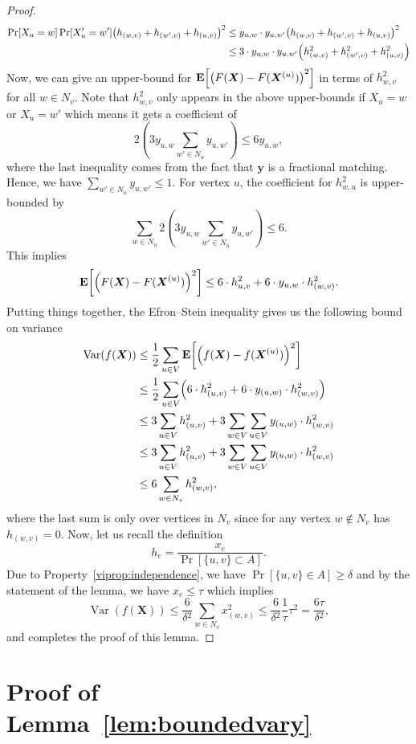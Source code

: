 \documentclass[letterpaper,11pt]{article}
\DeclareMathOperator{\E}{\ensuremath{\normalfont \textbf{E}}}
\newcommand{\unmapr}[0]{\ensuremath{\delta}}
\newcommand{\adj}{\ensuremath{N}\xspace}
\newcommand{\funcZ}[0]{f}
\DeclareMathOperator{\var}{Var}
\let\originalleft\left
\let\originalright\right
\renewcommand{\left}{\mathopen{}\mathclose\bgroup\originalleft}
\renewcommand{\right}{\aftergroup\egroup\originalright}
\begin{document}
\begin{proof}
\begin{align*}
\Pr[X_u=w]\Pr[X'_u=w']\left(h_{(w,v)} + h_{(w',v)} + h_{(u,v)}\right)^2
& \leq  y_{u,w}\cdot y_{u,w'}\left(h_{(w,v)} + h_{(w',v)}+h_{(u,v)}\right)^2\\
& \leq 3\cdot y_{u,w}\cdot y_{u,w'} \left(h_{(w,v)}^2 + h_{(w',v)}^2+h_{(u,v)}^2\right)
\end{align*}
Now, we can give an  upper-bound for $\E\left[\left(F(\bm{X}) - F(\bm{X}^{(u)}) \right)^2\right]$ in  terms of $h_{w,v}^2$ for all $w\in \adj_v$. Note that $h_{w,v}^2$ only appears in the above upper-bounds if $X_u=w$ or $X_u=w'$ which means it gets a coefficient of 
$$2(3y_{u,w}\sum_{w'\in \adj_u}y_{u,w'})\leq 6y_{u,w},$$ where  the last inequality comes from the fact that $\bm{y}$ is a fractional matching. Hence, we have $\sum_{w'\in \adj_u}y_{u,w'}\leq 1$.  For vertex $u$, the coefficient for  $h_{w,u}^2$ is upper-bounded by 
$$\sum_{w\in \adj_u}2(3y_{u,w}\sum_{w'\in \adj_u}y_{u,w'})\leq 6.$$ This implies 
$$\E\left[\left(F(\bm{X}) - F(\bm{X}^{(u)}) \right)^2\right]\leq 6\cdot h_{u,v}^2 + 6\cdot y_{u,w}\cdot h_{(w,v)}^2.$$ 
Putting things together, the Efron–Stein inequality gives us the following bound on variance
\begin{align}
    \var(\funcZ(\bm{X})) \nonumber &\leq \frac{1}{2} \sum_{u\in V} \E\left[\left(\funcZ(\bm{X}) - \funcZ(\bm{X}^{(u)}) \right)^2\right]\\ \nonumber
    &\leq \frac{1}{2} \sum_{u\in V} \left(6 \cdot h_{(u,v)}^2+ 6 \cdot y_{(u,w)} \cdot h_{(w,v)}^2\right)
    \\ \nonumber
    &\leq 3 \sum_{u\in V} h_{(u,v)}^2 +  3 \sum_{w\in V} \sum_{u\in V} y_{(u,w)} \cdot h_{(w,v)}^2
    \\ \nonumber
    &\leq 3 \sum_{u\in V} h_{(u,v)}^2 +  3 \sum_{w\in V} \sum_{u\in V} y_{(u,w)} \cdot h_{(w,v)}^2
    \\ 
    & \leq 6\sum_{w\in \adj_v}h_{(w,v)}^2, 
\end{align} 
where the last sum is only over vertices in $\adj_v$ since for any vertex $w\notin \adj_v$  has $h_{(w,v)}=0$.
Now, let us recall the definition $$h_e = \frac{x_e}{\Pr[\{u, v\} \subset A]}.$$ Due to Property~\ref{viprop:independence}, we have $\Pr[\{u,v\}\in A]\geq \unmapr{}$ and by the statement  of  the lemma, we have $x_e\leq \tau$ which implies
$$ \var(\funcZ(\bm{X}))\leq \frac{6}{\unmapr{}^2}\sum_{w\in \adj_v} x_{(w,v)}^2 \leq \frac{6}{\unmapr{}^2}\frac{1}{\tau}\tau^2 = \frac{6\tau}{\unmapr{}^2},
$$ and completes the proof of this lemma. 
\end{proof} \section{Proof of Lemma~\ref{lem:boundedvary}}\label{sec:prooflemma}
\end{document}
